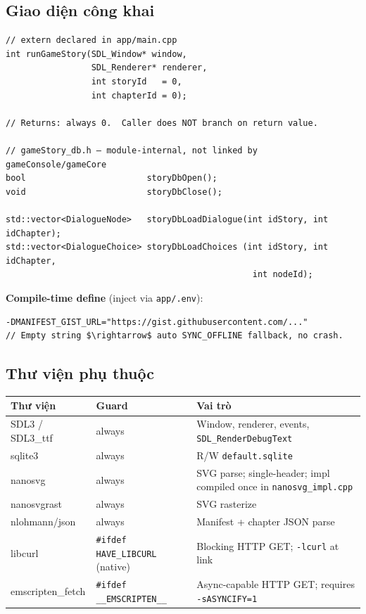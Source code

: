 \documentclass[12pt,a4paper]{article}
\begin{document}
\subsection{Giao diện công khai}

\begin{verbatim}
// extern declared in app/main.cpp
int runGameStory(SDL_Window* window,
                 SDL_Renderer* renderer,
                 int storyId   = 0,
                 int chapterId = 0);

// Returns: always 0.  Caller does NOT branch on return value.

// gameStory_db.h — module-internal, not linked by gameConsole/gameCore
bool                        storyDbOpen();
void                        storyDbClose();

std::vector<DialogueNode>   storyDbLoadDialogue(int idStory, int idChapter);
std::vector<DialogueChoice> storyDbLoadChoices (int idStory, int idChapter,
                                                 int nodeId);

\end{verbatim}

\noindent\textbf{Compile-time define} (inject via \texttt{app/.env}):
\begin{verbatim}
-DMANIFEST_GIST_URL="https://gist.githubusercontent.com/..."
// Empty string $\rightarrow$ auto SYNC_OFFLINE fallback, no crash.

\end{verbatim}

\subsection{Thư viện phụ thuộc}

\begin{tabularx}{\linewidth}{@{}l l X@{}}
\hline
\textbf{Thư viện} & \textbf{Guard} & \textbf{Vai trò} \\
\hline
SDL3 / SDL3\_ttf    & always       & Window, renderer, events, \texttt{SDL\_RenderDebugText} \\
sqlite3             & always       & R/W \texttt{default.sqlite} \\
nanosvg             & always       & SVG parse;
single-header; impl compiled once in \texttt{nanosvg\_impl.cpp} \\
nanosvgrast         & always       & SVG rasterize \\
nlohmann/json       & always       & Manifest + chapter JSON parse \\
libcurl             & \texttt{\#ifdef HAVE\_LIBCURL} (native) & Blocking HTTP GET;
\texttt{-lcurl} at link \\
emscripten\_fetch   & \texttt{\#ifdef \_\_EMSCRIPTEN\_\_}     & Async-capable HTTP GET;
requires \texttt{-sASYNCIFY=1} \\
\hline
\end{tabularx}
\end{document}
